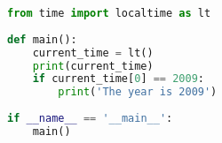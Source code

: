 \lstset{basicstyle=\scriptsize, numbers=left, captionpos=b, tabsize=4}
\begin{lstlisting}[caption=Alias Module,language={Python},
xleftmargin=15pt, label=lst:aliasmodule]
from time import localtime as lt 
 
def main():
    current_time = lt()
    print(current_time)
    if current_time[0] == 2009: 
        print('The year is 2009')
 
if __name__ == '__main__': 
    main()
\end{lstlisting}
